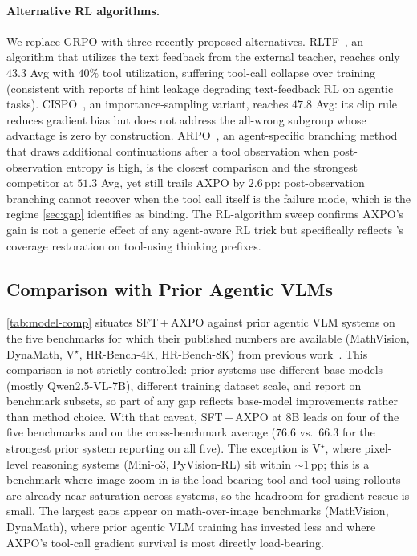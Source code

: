 \paragraph{Alternative RL algorithms.}
We replace GRPO with three recently proposed alternatives. RLTF~\citep{rltf}, an algorithm that utilizes the text feedback from the external teacher, reaches only $43.3$ Avg with $40\%$ tool utilization, suffering tool-call collapse over training (consistent with reports of hint leakage degrading text-feedback RL on agentic tasks). CISPO~\citep{cispo}, an importance-sampling variant, reaches $47.8$ Avg: its clip rule reduces gradient bias but does not address the all-wrong subgroup whose advantage is zero by construction. ARPO~\citep{arpo}, an agent-specific branching method that draws additional continuations after a tool observation when post-observation entropy is high, is the closest comparison and the strongest competitor at $51.3$ Avg, yet still trails AXPO by $2.6$\,pp: post-observation branching cannot recover when the tool call itself is the failure mode, which is the regime \autoref{sec:gap} identifies as binding. The RL-algorithm sweep confirms AXPO's gain is not a generic effect of any agent-aware RL trick but specifically reflects \toolresample's coverage restoration on tool-using thinking prefixes.

\subsection{Comparison with Prior Agentic VLMs}
\label{app:prior-agentic-vlms}

\autoref{tab:model-comp} situates SFT\,+\,AXPO against prior agentic VLM systems on the five benchmarks for which their published numbers are available (MathVision, DynaMath, V$^{\star}$, HR-Bench-4K, HR-Bench-8K) from previous work~\citep{pyvision-rl, deepeyesv2}.
This comparison is not strictly controlled: prior systems use different base models (mostly Qwen2.5-VL-7B), different training dataset scale, and report on benchmark subsets, so part of any gap reflects base-model improvements rather than method choice. 
With that caveat, SFT\,+\,AXPO at 8B leads on four of the five benchmarks and on the cross-benchmark average ($76.6$ vs.\ $66.3$ for the strongest prior system reporting on all five). The exception is V$^{\star}$, where pixel-level reasoning systems (Mini-o3, PyVision-RL) sit within $\sim$1\,pp; this is a benchmark where image zoom-in is the load-bearing tool and tool-using rollouts are already near saturation across systems, so the headroom for gradient-rescue is small. 
The largest gaps appear on math-over-image benchmarks (MathVision, DynaMath), where prior agentic VLM training has invested less and where AXPO's tool-call gradient survival is most directly load-bearing.


